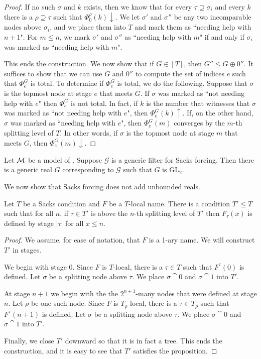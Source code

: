 \begin{proof}
If no such $\sigma$ and $k$ exists, then we know
that for every $\tau\supseteq\sigma_i$ and every $k$
there is a $\rho\supseteq\tau$ such that $\Phi_0^\rho(k)\downarrow$.
We let $\sigma'$ and $\sigma''$
be any two incomparable nodes above $\sigma_i$, and we
place them into $T$ and mark them as ``needing help with $n+1$".
For $m\leq n$, we mark $\sigma'$ and $\sigma''$
as ``needing help with $m$" if and only if $\sigma_i$
was marked as ``needing help with $m$".

This ends the construction.
We now show that if $G\in[T]$, then $G''\leq G\oplus 0''$.
It suffices to show that we can use $G$ and $0''$
to compute the set of indices $e$ such that
$\Phi_e^G$ is total.
To determine if $\Phi^G_e$ is total, we do the following.
Suppose that $\sigma$ is the topmost node at
stage $e$ that meets $G$.
If $\sigma$ was marked as ``not needing help with $e$"
then $\Phi_e^G$ is not total.
In fact, if $k$ is the number that witnesses that
$\sigma$ was marked as ``not needing help with $e$",
then $\Phi_e^G(k)\uparrow$.
If, on the other hand, $\sigma$ was marked as
``needing help with $e$", then $\Phi_e^G(m)$
converges by the $m$-th splitting level of $T$.
In other words, if $\sigma$ is the topmost node at
stage $m$ that meets $G$, then $\Phi_e^G(m)\downarrow$.
\end{proof}

\begin{cor}
Let $\mathcal{M}$ be a model of \ACAo.
Suppose $\mathcal{G}$ is a generic filter for Sacks forcing.
Then there is a generic real $G$ corresponding to $\mathcal{G}$
such that $G$ is GL$_2$.
\end{cor}

We now show that Sacks forcing does not add unbounded reals.

\begin{prop}[\RCAo]\label{P:Sk:StrBnding}
Let $T$ be a Sacks condition and $F$ be a $T$-local name.
There is a condition $T'\leq T$ such that for all $n$,
if $\tau\in T'$ is above the $n$-th splitting level of $T'$
then $F_\tau(x)$ is defined by stage $|\tau|$ for all $x\leq n$.
\end{prop}

\begin{proof}
We assume, for ease of notation,
that $F$ is a 1-ary name.
We will construct $T'$ in stages.

We begin with stage 0.
Since $F$ is $T$-local, there is a $\tau\in T$ such that $F^\tau(0)$ is defined.
Let $\sigma$ be a splitting node above $\tau$.
We place $\sigma\cat{0}$ and $\sigma\cat{1}$ into $T'$.

At stage $n+1$ we begin with the the $2^{n+1}$-many
nodes that were defined at stage $n$.
Let $\rho$ be one such node.
Since $F$ is $T_\rho$-local, there is a $\tau\in T_\rho$ such that $F^\tau(n+1)$ is defined.
Let $\sigma$ be a splitting node above $\tau$.
We place $\sigma\cat{0}$ and $\sigma\cat{1}$ into $T'$.

Finally, we close $T'$ downward so that it is in fact a tree.
This ends the construction, and it is easy to see that $T'$
satisfies the proposition.
\end{proof}

